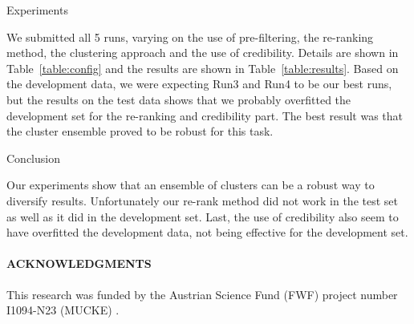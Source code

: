 \documentclass{acm_proc_article-me}
\begin{document}
\begin{section}{Experiments}

We submitted all 5 runs, varying on the use of pre-filtering, the re-ranking method, the clustering approach and the use of credibility.
Details are shown in Table~\ref{table:config} and the results are shown in Table~\ref{table:results}.
Based on the development data, we were expecting Run3 and Run4 to be our best runs, but the results on the test data shows that we probably 
overfitted the development set for the re-ranking and credibility part. The best result was that the cluster ensemble proved to be robust for this task.


%
%
\end{section}
\begin{section}{Conclusion}

Our experiments show that an ensemble of clusters can be a robust way to diversify results.
Unfortunately our re-rank method did not work in the test set as well as it did in the development set.
Last, the use of credibility also seem to have overfitted the development data, not being effective for the development set.

\end{section}

\paragraph{\textbf{ACKNOWLEDGMENTS}}
This research was funded by the Austrian Science Fund (FWF) project number I1094-N23 (MUCKE) .


  
\end{document}
